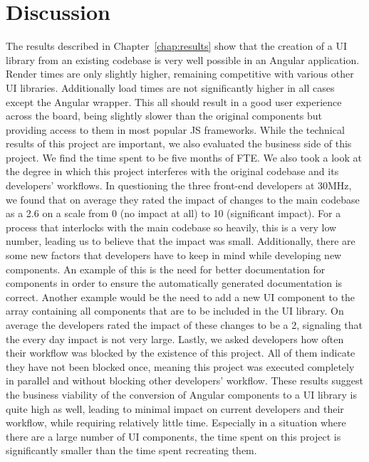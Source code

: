 \chapter{Discussion}\label{chap:discussion}

The results described in Chapter~\ref{chap:results} show that the creation of a UI library from an existing codebase is very well possible in an Angular application. Render times are only slightly higher, remaining competitive with various other UI libraries. Additionally load times are not significantly higher in all cases except the Angular wrapper. This all should result in a good user experience across the board, being slightly slower than the original components but providing access to them in most popular JS frameworks.
While the technical results of this project are important, we also evaluated the business side of this project. We find the time spent to be five months of FTE\@. We also took a look at the degree in which this project interferes with the original codebase and its developers' workflows. In questioning the three front-end developers at 30MHz, we found that on average they rated the impact of changes to the main codebase as a 2.6 on a scale from 0 (no impact at all) to 10 (significant impact). For a process that interlocks with the main codebase so heavily, this is a very low number, leading us to believe that the impact was small. Additionally, there are some new factors that developers have to keep in mind while developing new components. An example of this is the need for better documentation for components in order to ensure the automatically generated documentation is correct. Another example would be the need to add a new UI component to the array containing all components that are to be included in the UI library. On average the developers rated the impact of these changes to be a 2, signaling that the every day impact is not very large. Lastly, we asked developers how often their workflow was blocked by the existence of this project. All of them indicate they have not been blocked once, meaning this project was executed completely in parallel and without blocking other developers' workflow. These results suggest the business viability of the conversion of Angular components to a UI library is quite high as well, leading to minimal impact on current developers and their workflow, while requiring relatively little time. Especially in a situation where there are a large number of UI components, the time spent on this project is significantly smaller than the time spent recreating them.

